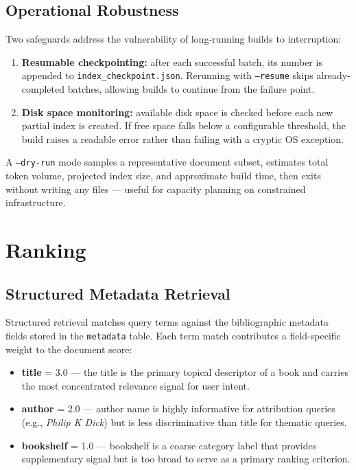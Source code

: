 \documentclass[sigconf]{acmart}
\begin{document}
\subsection{Operational Robustness}

Two safeguards address the vulnerability of long-running builds to interruption:

\begin{enumerate}
    \item \textbf{Resumable checkpointing:} after each successful batch, its number is appended to \texttt{index\_checkpoint.json}. Rerunning with \texttt{--resume} skips already-completed batches, allowing builds to continue from the failure point.
    \item \textbf{Disk space monitoring:} available disk space is checked before each new partial index is created. If free space falls below a configurable threshold, the build raises a readable error rather than failing with a cryptic OS exception.
\end{enumerate}

A \texttt{--dry-run} mode samples a representative document subset, estimates total token volume, projected index size, and approximate build time, then exits without writing any files --- useful for capacity planning on constrained infrastructure.

\section{Ranking}

\subsection{Structured Metadata Retrieval}

Structured retrieval matches query terms against the bibliographic metadata fields stored in the \texttt{metadata} table. Each term match contributes a field-specific weight to the document score:

\begin{itemize}
    \item \textbf{title} = 3.0 --- the title is the primary topical descriptor of a book and carries the most concentrated relevance signal for user intent.
    \item \textbf{author} = 2.0 --- author name is highly informative for attribution queries (e.g., \emph{Philip K Dick}) but is less discriminative than title for thematic queries.
    \item \textbf{bookshelf} = 1.0 --- bookshelf is a coarse category label that provides supplementary signal but is too broad to serve as a primary ranking criterion.
\end{itemize}
\end{document}
